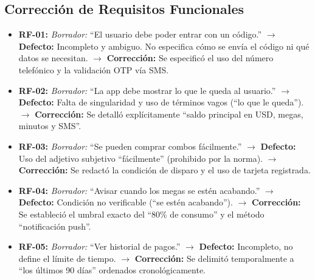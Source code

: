 \documentclass[12pt,a4paper]{article}
\begin{document}
\subsection{Corrección de Requisitos Funcionales}
\begin{itemize}
    \item \textbf{RF-01:} \textit{Borrador:} ``El usuario debe poder entrar con un código.'' $\rightarrow$ \textbf{Defecto:} Incompleto y ambiguo. No especifica cómo se envía el código ni qué datos se necesitan. $\rightarrow$ \textbf{Corrección:} Se especificó el uso del número telefónico y la validación OTP vía SMS.
    \item \textbf{RF-02:} \textit{Borrador:} ``La app debe mostrar lo que le queda al usuario.'' $\rightarrow$ \textbf{Defecto:} Falta de singularidad y uso de términos vagos (``lo que le queda''). $\rightarrow$ \textbf{Corrección:} Se detalló explícitamente ``saldo principal en USD, megas, minutos y SMS''.
    \item \textbf{RF-03:} \textit{Borrador:} ``Se pueden comprar combos fácilmente.'' $\rightarrow$ \textbf{Defecto:} Uso del adjetivo subjetivo ``fácilmente'' (prohibido por la norma). $\rightarrow$ \textbf{Corrección:} Se redactó la condición de disparo y el uso de tarjeta registrada.
    \item \textbf{RF-04:} \textit{Borrador:} ``Avisar cuando los megas se estén acabando.'' $\rightarrow$ \textbf{Defecto:} Condición no verificable (``se estén acabando''). $\rightarrow$ \textbf{Corrección:} Se estableció el umbral exacto del ``80\% de consumo'' y el método ``notificación push''.
    \item \textbf{RF-05:} \textit{Borrador:} ``Ver historial de pagos.'' $\rightarrow$ \textbf{Defecto:} Incompleto, no define el límite de tiempo. $\rightarrow$ \textbf{Corrección:} Se delimitó temporalmente a ``los últimos 90 días'' ordenados cronológicamente.
\end{itemize}
\end{document}
